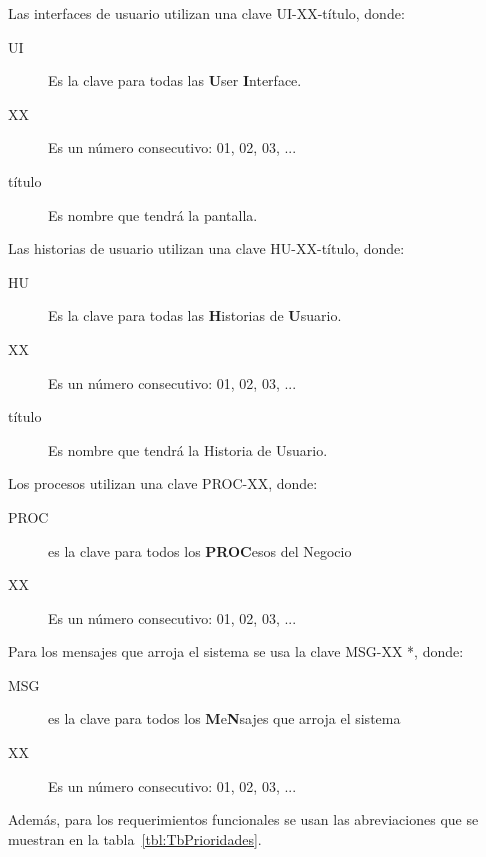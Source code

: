 Las interfaces de usuario utilizan una clave UI-XX-título, donde:
    
\begin{description}
    \item[UI] Es la clave para todas las {\bf U}ser {\bf I}nterface.
    \item[XX] Es un número consecutivo: 01, 02, 03, ...
    \item[título] Es nombre que tendrá la pantalla.
\end{description}

Las historias de usuario utilizan una clave HU-XX-título, donde:
    
\begin{description}
    \item[HU] Es la clave para todas las {\bf H}istorias de {\bf U}suario.
    \item[XX] Es un número consecutivo: 01, 02, 03, ...
    \item[título] Es nombre que tendrá la Historia de Usuario.
\end{description}

Los procesos utilizan una clave PROC-XX, donde:
    
\begin{description}
    \item[PROC] es la clave para todos los {\bf PROC}esos del Negocio
    \item[XX] Es un número consecutivo: 01, 02, 03, ...
\end{description}

Para los mensajes que arroja el sistema se usa la clave MSG-XX *, donde:
    
\begin{description}
    \item[MSG] es la clave para todos los {\bf M}e{\bf N}sajes que arroja el sistema
    \item[XX] Es un número consecutivo: 01, 02, 03, ...
\end{description}
\clearpage
Además, para los requerimientos funcionales se usan las abreviaciones que se muestran en la tabla~\ref{tbl:TbPrioridades}.

